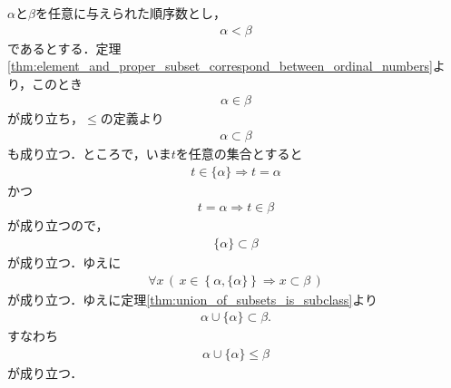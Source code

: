	\begin{sketch}
		$\alpha$と$\beta$を任意に与えられた順序数とし，
		\begin{align}
			\alpha < \beta
		\end{align}
		であるとする．定理\ref{thm:element_and_proper_subset_correspond_between_ordinal_numbers}より，このとき
		\begin{align}
			\alpha \in \beta
		\end{align}
		が成り立ち，$\leq$の定義より
		\begin{align}
			\alpha \subset \beta
		\end{align}
		も成り立つ．ところで，いま$t$を任意の集合とすると
		\begin{align}
			t \in \{\alpha\} \Longrightarrow t = \alpha
		\end{align}
		かつ
		\begin{align}
			t = \alpha \Longrightarrow t \in \beta
		\end{align}
		が成り立つので，
		\begin{align}
			\{\alpha\} \subset \beta
		\end{align}
		が成り立つ．ゆえに
		\begin{align}
			\forall x\, \left(\, x \in \left\{ \alpha, \{\alpha\} \right\} \Longrightarrow x \subset \beta\, \right)
		\end{align}
		が成り立つ．ゆえに定理\ref{thm:union_of_subsets_is_subclass}より
		\begin{align}
			\alpha \cup \{\alpha\} \subset \beta.
		\end{align}
		すなわち
		\begin{align}
			\alpha \cup \{\alpha\} \leq \beta
		\end{align}
		が成り立つ．
		\QED
	\end{sketch}